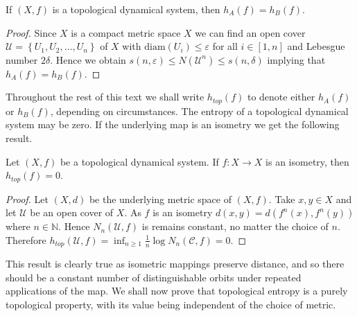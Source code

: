 \begin{prop}
    If $(X, f)$ is a topological dynamical system, then $h_A(f) = h_B(f)$.
    \begin{proof}
        Since $X$ is a compact metric space $X$ we can find an open cover $\mathcal{U} = \left\lbrace U_1, U_2, \dots, U_n \right\rbrace$ of $X$ with $\text{diam}(U_i) \leq \varepsilon$ for all $i \in [1, n]$ and Lebesgue number $2\delta$. Hence we obtain $s(n, \varepsilon) \leq N(\mathcal{U}^n) \leq s(n, \delta)$ implying that $h_A(f) = h_B(f)$.
    \end{proof}
\end{prop}

Throughout the rest of this text we shall write $h_{top}(f)$ to denote either $h_A(f)$ or $h_B(f)$, depending on circumstances. The entropy of a topological dynamical system may be zero. If the underlying map is an isometry we get the following result.

\begin{prop} \label{prop:isometry-entropy}
    Let $(X, f)$ be a topological dynamical system. If $f: X \to X$ is an isometry, then $h_{top}(f) = 0$.
    \begin{proof}
        Let $(X, d)$ be the underlying metric space of $(X, f)$. Take $x, y \in X$ and let $\mathcal{U}$ be an open cover of $X$. As $f$ is an isometry $d(x, y) = d(f^n(x), f^n(y))$ where $n \in \mathbb{N}$. Hence $N_n(\mathcal{U}, f)$ is remains constant, no matter the choice of $n$. Therefore $h_{top}(\mathcal{U}, f) = \inf_{n \geq 1} \frac{1}{n}\log{N_n(\mathcal{C}, f)} = 0$.
    \end{proof}
\end{prop}

This result is clearly true as isometric mappings preserve distance, and so there should be a constant number of distinguishable orbits under repeated applications of the map. We shall now prove that topological entropy is a purely topological property, with its value being independent of the choice of metric.

